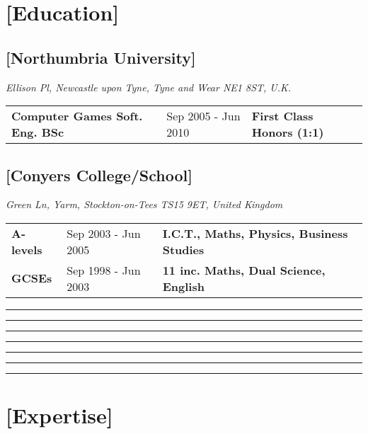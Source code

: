 \documentclass[a4paper]{res}
\newcommand{\setrule}[1]{\rule{#1}{1mm}}
\newcommand{\fibrule}[2]{ \hspace{#1}  \setrule{#2} \setrule{21mm} \setrule{13mm} \setrule{8mm} \setrule{5mm} \setrule{3mm} \setrule{2mm}  \vspace{-.52in} }
\begin{document}
\begin{resume}
\section{[Education]} 

\vspace{-.2in}

\subsection{[Northumbria University]}\textit{Ellison Pl, Newcastle upon Tyne, Tyne and Wear NE1 8ST, U.K.}
\vspace{-.15in}

\begin{tabular}{| l | l | l }

{\bf Computer Games Soft. Eng. BSc} & Sep 2005 - Jun 2010 &{\bf  First Class Honors (1:1)}  \\

\end{tabular}

\vspace{-.3in}

\subsection{[Conyers College/School]}\textit{Green Ln, Yarm, Stockton-on-Tees TS15 9ET, United Kingdom}
\vspace{-.15in}

\begin{tabular}{| l | l | l }

{\bf A-levels}& Sep 2003 - Jun 2005 & {\bf  I.C.T., Maths, Physics, Business Studies}  \\
{\bf GCSEs}  & Sep 1998 - Jun 2003 & {\bf 11 inc.  Maths, Dual Science, English} \\

\end{tabular}

\vspace{.15in}

\fibrule{0.9in}{3.0in}
\section{[Expertise]} 


\end{resume}
\end{document}
